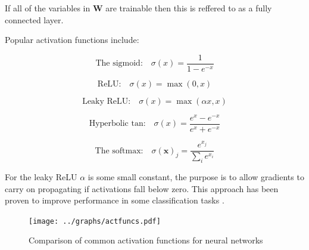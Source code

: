     If all of the variables in $\mathbf{W}$ are trainable then this is reffered to as a
    fully connected layer.

    Popular activation functions include:
    \begin{multicols}{2}


      \begin{equation}
        \text{The sigmoid:}\quad
        \sigma (x) = \frac{1}{1-e^{-x}} \label{eq:sigmoid}
      \end{equation}


      \begin{equation}
        \text{ReLU:}\quad
        \sigma(x) = \max(0,x)
      \end{equation}

      \begin{equation}
        \text{Leaky ReLU:}\quad
        \sigma(x) = \max(\alpha x,x)
      \end{equation}


      \begin{equation}
        \text{Hyperbolic tan:}\quad
        \sigma(x)=\frac{e^x - e^{-x}}{e^x + e^{-x}}
      \end{equation}


      \begin{equation}
        \text{The softmax:}\quad
        \sigma(\mathbf{x})_j = \frac{e^{x_j}}{\sum_i e^{x_i}}
      \end{equation}


    \end{multicols}

    For the leaky ReLU $\alpha$ is some small constant, the purpose is to allow gradients to carry on
    propagating if activations fall below zero. This approach has been proven to improve performance in some classification
    tasks \cite{Xu2015}.

    \begin{figure} \label{disfagraph}
      \center
      \texttt{[image: ../graphs/actfuncs.pdf]}
      \caption{Comparison of common activation functions for neural networks}
    \end{figure}




